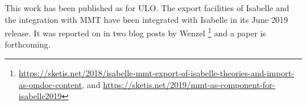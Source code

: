 This work has been published as  for ULO.
The export facilities of Isabelle and the integration with MMT have been integrated with Isabelle in its June 2019 release.
It was reported on in two blog posts by Wenzel%
\footnote{\url{https://sketis.net/2018/isabelle-mmt-export-of-isabelle-theories-and-import-as-omdoc-content}, and \url{https://sketis.net/2019/mmt-as-component-for-isabelle2019}}
and a paper is forthcoming.


